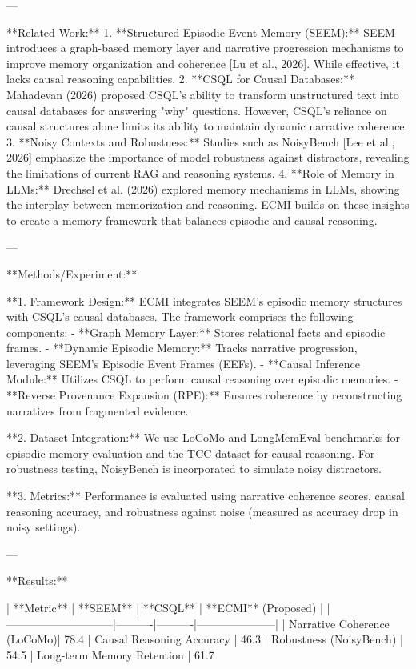 ---

**Related Work:**  
1. **Structured Episodic Event Memory (SEEM):** SEEM introduces a graph-based memory layer and narrative progression mechanisms to improve memory organization and coherence [Lu et al., 2026]. While effective, it lacks causal reasoning capabilities.  
2. **CSQL for Causal Databases:** Mahadevan (2026) proposed CSQL's ability to transform unstructured text into causal databases for answering "why" questions. However, CSQL's reliance on causal structures alone limits its ability to maintain dynamic narrative coherence.  
3. **Noisy Contexts and Robustness:** Studies such as NoisyBench [Lee et al., 2026] emphasize the importance of model robustness against distractors, revealing the limitations of current RAG and reasoning systems.  
4. **Role of Memory in LLMs:** Drechsel et al. (2026) explored memory mechanisms in LLMs, showing the interplay between memorization and reasoning. ECMI builds on these insights to create a memory framework that balances episodic and causal reasoning.  

---

**Methods/Experiment:**  

**1. Framework Design:**  
ECMI integrates SEEM's episodic memory structures with CSQL's causal databases. The framework comprises the following components:  
- **Graph Memory Layer:** Stores relational facts and episodic frames.  
- **Dynamic Episodic Memory:** Tracks narrative progression, leveraging SEEM's Episodic Event Frames (EEFs).  
- **Causal Inference Module:** Utilizes CSQL to perform causal reasoning over episodic memories.  
- **Reverse Provenance Expansion (RPE):** Ensures coherence by reconstructing narratives from fragmented evidence.  

**2. Dataset Integration:**  
We use LoCoMo and LongMemEval benchmarks for episodic memory evaluation and the TCC dataset for causal reasoning. For robustness testing, NoisyBench is incorporated to simulate noisy distractors.  

**3. Metrics:**  
Performance is evaluated using narrative coherence scores, causal reasoning accuracy, and robustness against noise (measured as accuracy drop in noisy settings).  

---

**Results:**  

| **Metric**                  | **SEEM** | **CSQL** | **ECMI** (Proposed) |
|-----------------------------|----------|----------|---------------------|
| Narrative Coherence (LoCoMo)| 78.4%
| Causal Reasoning Accuracy   | 46.3%
| Robustness (NoisyBench)     | 54.5%
| Long-term Memory Retention  | 61.7%


